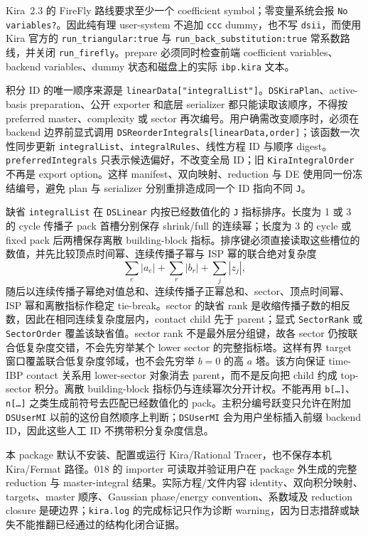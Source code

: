 ﻿\documentclass[a4paper,11pt]{article}
\begin{document}
Kira~2.3 的 FireFly 路线要求至少一个 coefficient symbol；零变量系统会报 \texttt{No variables?}。因此纯有理 user-system 不追加 \texttt{ccc} dummy，也不写 \texttt{dsii}，而使用 Kira 官方的 \texttt{run\_triangular:true} 与 \texttt{run\_back\_substitution:true} 常系数路线，并关闭 \texttt{run\_firefly}。prepare 必须同时检查前端 coefficient variables、backend variables、dummy 状态和磁盘上的实际 \texttt{ibp.kira} 文本。

积分 ID 的唯一顺序来源是 \texttt{linearData["integralList"]}。\texttt{DSKiraPlan}、active-basis preparation、公开 exporter 和底层 serializer 都只能读取该顺序，不得按 preferred master、complexity 或 sector 再次编号。用户确需改变顺序时，必须在 backend 边界前显式调用 \texttt{DSReorderIntegrals[linearData,order]}；该函数一次性同步更新 \texttt{integralList}、\texttt{integralRules}、线性方程 ID 与顺序 digest。\texttt{preferredIntegrals} 只表示候选偏好，不改变全局 ID；旧 \texttt{KiraIntegralOrder} 不再是 export option。这样 manifest、双向映射、reduction 与 DE 使用同一份冻结编号，避免 plan 与 serializer 分别重排造成同一个 ID 指向不同 \texttt{J}。

缺省 \texttt{integralList} 在 \texttt{DSLinear} 内按已经数值化的 \texttt{J} 指标排序。长度为 1 或 3 的 cycle 传播子 pack 首槽分别保存 shrink/full 的连续幂；长度为 3 的 cycle 或 fixed pack 后两槽保存离散 building-block 指标。排序键必须直接读取这些槽位的数值，并先比较顶点时间幂、连续传播子幂与 ISP 幂的联合绝对复杂度
\[
 \sum_e |a_e|+\sum_r |b_r|+\sum_j |z_j|,
\]
随后以连续传播子幂绝对值总和、连续传播子正幂总和、sector、顶点时间幂、ISP 幂和离散指标作稳定 tie-break。sector 的缺省 rank 是收缩传播子数的相反数，因此在相同连续复杂度层内，contact child 先于 parent；显式 \texttt{SectorRank} 或 \texttt{SectorOrder} 覆盖该缺省值。sector rank 不是最外层分组键，故各 sector 仍按联合低复杂度交错，不会先穷举某个 lower sector 的完整指标塔。这样有界 target 窗口覆盖联合低复杂度邻域，也不会先穷举 \(b=0\) 的高 \(a\) 塔。该方向保证 time-IBP contact 关系用 lower-sector 对象消去 parent，而不是反向把 child 约成 top-sector 积分。离散 building-block 指标仍与连续幂次分开计权。不能再用 \texttt{b[\ldots]}、\texttt{n[\ldots]} 之类生成前符号去匹配已经数值化的 pack。主积分编号跃变只允许在附加 \texttt{DSUserMI} 以前的这份自然顺序上判断；\texttt{DSUserMI} 会为用户坐标插入前缀 backend ID，因此这些人工 ID 不携带积分复杂度信息。

本 package 默认不安装、配置或运行 Kira/Rational Tracer，也不保存本机 Kira/Fermat 路径。018 的 importer 可读取并验证用户在 package 外生成的完整 reduction 与 master-integral 结果。实际方程/文件内容 identity、双向积分映射、targets、master 顺序、Gaussian phase/energy convention、系数域及 reduction closure 是硬边界；\texttt{kira.log} 的完成标记只作为诊断 warning，因为日志措辞或缺失不能推翻已经通过的结构化闭合证据。
\end{document}
